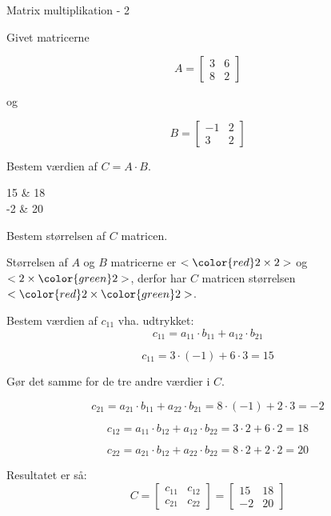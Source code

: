 \documentclass{article}
\begin{document}
\newpage

\begin{exercise}{Matrix multiplikation - 2}
	
	Givet matricerne 
	
	\[
	A = \left[\begin{array}{rr}
	3 & 6 \\ 
	8 & 2 
	\end{array} \right]
	\]
	
	og 
	
	\[
	B = \left[\begin{array}{rr}
	-1 & 2 \\ 
	3 & 2 
	\end{array} \right]
	\]
	
	Bestem værdien af $C = A \cdot B$.
	
	\begin{answermatrix}
		15 & 18  \\
		-2 & 20 
	\end{answermatrix}
	
	\hint
	Bestem størrelsen af $C$ matricen.
	
	\hint
	Størrelsen af $A$ og $B$ matricerne er $<{\color{red} 2} \times 2>$ og $<2 \times {\color{green}2}>$, 
	derfor har $C$ matricen størrelsen $<{\color{red} 2} \times {\color{green}2}>$.
	
	\hint
	Bestem værdien af $c_{11}$ vha. udtrykket:
	\[
	c_{11} = a_{11} \cdot b_{11} + a_{12} \cdot b_{21}
	\]
	
	\hint
	\[
	c_{11} = 3 \cdot (-1) + 6 \cdot 3 = 15
	\]
	
	\hint
	Gør det samme for de tre andre værdier i $C$.
	
	\hint
	\[
		c_{21} = a_{21} \cdot b_{11} + a_{22} \cdot b_{21} = 8 \cdot (-1) + 2 \cdot 3 = -2
	\]
	
	\hint
	\[
		c_{12} = a_{11} \cdot b_{12} + a_{12} \cdot b_{22} = 3 \cdot 2 + 6 \cdot 2 = 18
	\]
	
	\hint
	\[
		c_{22} = a_{21} \cdot b_{12} + a_{22} \cdot b_{22} = 8 \cdot 2 + 2 \cdot 2 = 20
	\]
	
	
	\hint
	Resultatet er så:
	\[
	C = \left[\begin{array}{rr}
	c_{11} & c_{12} \\
	c_{21} & c_{22} 
	\end{array} \right] = 
	\left[\begin{array}{rr}
	15 & 18 \\
	-2 & 20 
	\end{array} \right]
	\]
	
	
\end{exercise}
\end{document}
